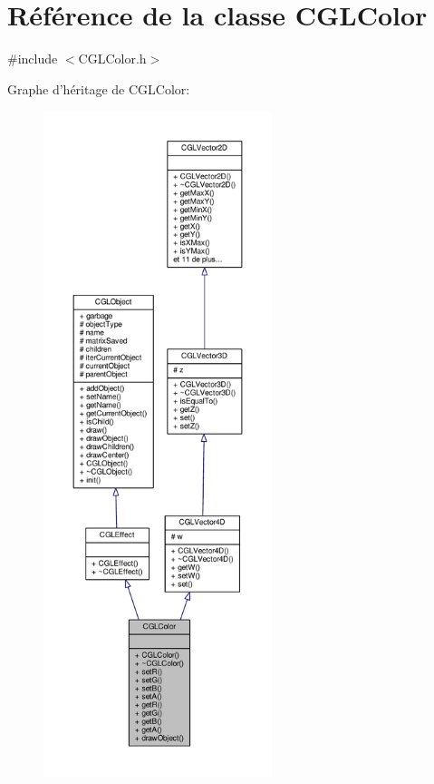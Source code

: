 \hypertarget{class_c_g_l_color}{\section{Référence de la classe C\-G\-L\-Color}
\label{class_c_g_l_color}
}


{\ttfamily \#include $<$C\-G\-L\-Color.\-h$>$}



Graphe d'héritage de C\-G\-L\-Color\-:
\nopagebreak
\begin{figure}[H]
\begin{center}
\leavevmode
\includegraphics[height=550pt]{d0/d0d/class_c_g_l_color__inherit__graph}
\end{center}
\end{figure}


